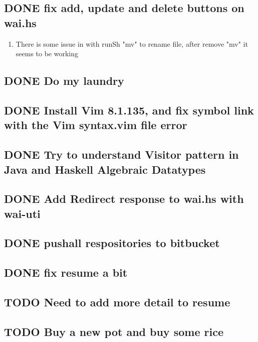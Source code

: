 \documentclass[11pt]{article}
\begin{document}
\subsection{{\bfseries\sffamily DONE} fix add, update and delete buttons on wai.hs}
\label{sec:orgbb4b3eb}
\begin{enumerate}
\item There is some issue in with runSh "mv" to rename file, after remove "mv" it seems to be working
\end{enumerate}
\subsection{{\bfseries\sffamily DONE} Do my laundry}
\label{sec:org5d9f74e}
\subsection{{\bfseries\sffamily DONE} Install Vim 8.1.135, and fix symbol link with the Vim syntax.vim file error}
\label{sec:org4a38c54}
\subsection{{\bfseries\sffamily DONE} Try to understand Visitor pattern in Java and Haskell Algebraic Datatypes}
\label{sec:org13e06fa}
\subsection{{\bfseries\sffamily DONE} Add Redirect response to wai.hs with wai-uti}
\label{sec:org3a5daaf}
\subsection{{\bfseries\sffamily DONE} pushall respositories to bitbucket}
\label{sec:orgdb94095}
\subsection{{\bfseries\sffamily DONE} fix resume a bit}
\label{sec:org6e3e9d3}
\subsection{{\bfseries\sffamily TODO} Need to add more detail to resume}
\label{sec:org907efcc}
\subsection{{\bfseries\sffamily TODO} Buy a new pot and buy some rice}
\label{sec:orgb15fa8d}
\end{document}
